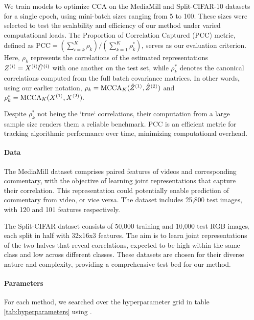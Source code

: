 We train models to optimize CCA on the MediaMill and Split-CIFAR-10 datasets for a single epoch, using mini-batch sizes ranging from 5 to 100. These sizes were selected to test the scalability and efficiency of our method under varied computational loads. The Proportion of Correlation Captured (PCC) metric, defined as \( \text{PCC} = (\sum_{i=k}^K \rho_k)/ ({\sum_{k=1}^K \rho_k^*}) \), serves as our evaluation criterion. Here, $\rho_k$ represents the correlations of the estimated representations $Z^{(i)}=X^{(i)}\hat{U}^{(i)}$ with one another on the test set, while $\rho_k^*$ denotes the canonical correlations computed from the full batch covariance matrices.
In other words, using our earlier notation, $\rho_k = \operatorname{MCCA}_K(\hat{Z}^{(1)}, \hat{Z}^{(2)})$ and $\rho_k^* = \operatorname{MCCA}_K(X^{(1)}, X^{(2)})$.

Despite $\rho_k^*$ not being the `true` correlations, their computation from a large sample size renders them a reliable benchmark. PCC is an efficient metric for tracking algorithmic performance over time, minimizing computational overhead\citep{meng2021online, gemp2022generalized, ma2015finding, ge2016efficient}.

\paragraph{Data}
The MediaMill dataset \citep{gemert2008visual} comprises paired features of videos and corresponding commentary, with the objective of learning joint representations that capture their correlation. This representation could potentially enable prediction of commentary from video, or vice versa. The dataset includes 25,800 test images, with 120 and 101 features respectively.

The Split-CIFAR dataset \citep{meng2021online} consists of 50,000 training and 10,000 test RGB images, each split in half with 32x16x3 features. The aim is to learn joint representations of the two halves that reveal correlations, expected to be high within the same class and low across different classes. These datasets are chosen for their diverse nature and complexity, providing a comprehensive test bed for our method.

\paragraph{Parameters} For each method, we searched over the hyperparameter grid in table \ref{tab:hyperparameters} using \citet{wandb}.

